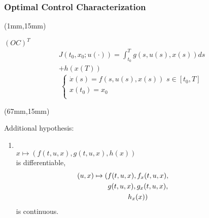 \begin{frame}[plain]
    \frametitle{Optimal Control Characterization}
    \begin{textblock*}{65mm}(1mm,15mm)
        \begin{yellowbox}{$(OC)^T$}
            \begin{multline*}
                J(t_0,x_0;u(\cdot))
                    = \int_{t_0}^{T} g(s,u(s),x(s)) ds
                    \\
                         + h(x(T))
            \end{multline*}
            $$
                \left\{ 
                    \begin{array}{l}
                        \dot{x}(s)=f(s,u(s),x(s))\,\,s\in [t_0,T]
                        \\
                        x(t_0)=x_0
                        \\
                    \end{array}
                \right.
            $$
        \end{yellowbox}
    \end{textblock*}
%
    \begin{textblock*}{60mm}(67mm,15mm)
        \begin{graybox}{Additional hypothesis:}
            \begin{enumerate}[(\textbf{{C}}-4)]
                \item
                \hspace*{-2mm}
                \\
                $
                    x \mapsto 
                    \left(
                        f(t,u,x),g(t,u,x),h(x)
                    \right)
                $
                \\
                is differentiable,
                \\
                \begin{multline*}
                    \hspace*{-15mm}
                    (u,x) 
                    \mapsto 
                    (f(t,u,x),f_x(t,u,x),
                    \\
                    g(t,u,x),g_x(t,u,x),
                    \\
                    h_x(x))
                \end{multline*}
                is continuous.
            \end{enumerate}
        \end{graybox}
    \end{textblock*}
\end{frame}
